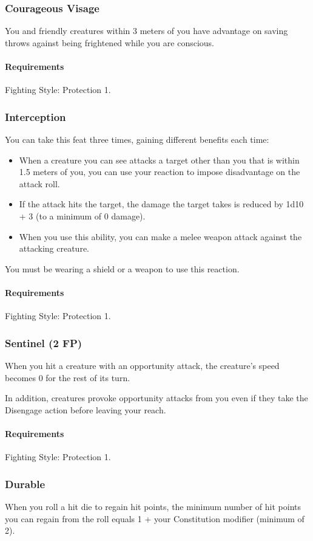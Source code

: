 \subsubsection{Courageous Visage} \label{feat::courageousvisage}
    You and friendly creatures within 3 meters of you have advantage on saving throws against being frightened while you are conscious.
    \paragraph{Requirements} Fighting Style: Protection 1.
\subsubsection{Interception} \label{feat::interception}
    You can take this feat three times, gaining different benefits each time:
    \begin{itemize}
        \item When a creature you can see attacks a target other than you that is within 1.5 meters of you, you can use your reaction to impose disadvantage on the attack roll.
        \item If the attack hits the target, the damage the target takes is reduced by 1d10 + 3 (to a minimum of 0 damage).
        \item When you use this ability, you can make a melee weapon attack against the attacking creature.
    \end{itemize}
    You must be wearing a shield or a weapon to use this reaction.
    \paragraph{Requirements} Fighting Style: Protection 1.
\subsubsection{Sentinel (2 FP)} \label{feat::sentinel}
    When you hit a creature with an opportunity attack, the creature's speed becomes 0 for the rest of its turn.

    In addition, creatures provoke opportunity attacks from you even if they take the Disengage action before leaving your reach.
    \paragraph{Requirements} Fighting Style: Protection 1.
\subsubsection{Durable} \label{feat::durable}
    When you roll a hit die to regain hit points, the minimum number of hit points you can regain from the roll equals 1 + your Constitution modifier (minimum of 2).
